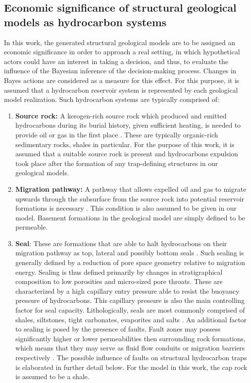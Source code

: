         \subsection{Economic significance of structural geological models as hydrocarbon systems}\label{sec:Reservoir_values}
        In this work, the generated structural geological models are to be assigned an economic significance in order to approach a real setting, in which hypothetical actors could have an interest in taking a decision, and thus, to evaluate the influence of the Bayesian inference of the decision-making process. Changes in Bayes actions are considered as a measure for this effect. For this purpose, it is assumed that a hydrocarbon reservoir system is represented by each geological model realization.
        Such hydrocarbon systems are typically comprised of:
        \begin{enumerate}
        	\item \textbf{Source rock:} A kerogen-rich source rock which produced and emitted hydrocarbons during its burial history, given sufficient heating, is needed to provide oil or gas in the first place \citep{dolson2016basics}. These are typically organic-rich sedimentary rocks, shales in particular. For the purpose of this work, it is assumed that a  suitable source rock is present and hydrocarbons expulsion took place after the formation of any trap-defining structures in our geological models.
        	\item \textbf{Migration pathway:} A pathway that allows expelled oil and gas to migrate upwards through the subsurface from the source rock into potential reservoir formations is necessary \citep{dolson2016basics}. This condition is also assumed to be given in our model. Basement formations in the geological model are simply defined to be permeable.
        	\item \textbf{Seal}: These are formations that are able to halt hydrocarbons on their migration pathway as top, lateral and possibly bottom seals \citep{dolson2016basics, sorkhabi2005place}. Such sealing is generally defined by a reduction of pore space geometry relative to migration energy. Sealing is thus defined primarily by changes in stratigraphical composition to low porosities and micro-sized pore throats. These are characterized by a high capillary entry pressure able to resist the buoyancy pressure of hydrocarbons. This capillary pressure is also the main controlling factor for seal capacity. Lithologically, seals are most commonly comprised of shales, siltstones, tight carbonates, evaporites and salts \citep{dolson2016basics, dolson2016quantifying, sorkhabi2005place}. An additional factor to sealing is posed by the presence of faults. Fault zones may possess significantly higher or lower permeabilities then surrounding rock formations, which means that they may serve as fluid flow conduits or migration barriers respectively \citep{van2003lateral, sorkhabi2005place}. The possible influence of faults on structural hydrocarbon traps is elaborated in further detail below. For the model in this work, the cap rock is assumed to be a shale.

\end{enumerate}
